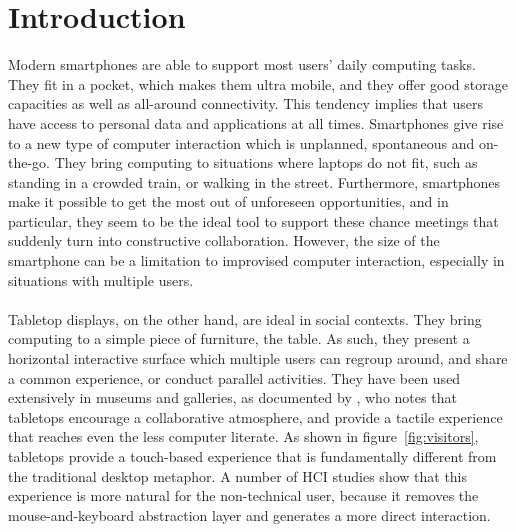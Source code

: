 

%

\chapter{Introduction}
\label{introduction}

Modern smartphones are able to support most users' daily computing tasks.
They fit in a pocket, which makes them ultra mobile, and they offer good storage capacities as well as all-around connectivity.
This tendency implies that users have access to personal data and applications at all times.
Smartphones give rise to a new type of computer interaction which is unplanned, spontaneous and on-the-go.
They bring computing to situations where laptops do not fit, such as standing in a crowded train, or walking in the street.
Furthermore, smartphones make it possible to get the most out of unforeseen opportunities, and in particular, they seem to be the ideal tool to support these chance meetings that suddenly turn into constructive collaboration.
However, the size of the smartphone can be a limitation to improvised computer interaction, especially in situations with multiple users. 
\\\\
Tabletop displays, on the other hand, are ideal in social contexts.
They bring computing to a simple piece of furniture, the table.
As such, they present a horizontal interactive surface which multiple users can regroup around, and share a common experience, or conduct parallel activities.
They have been used extensively in museums and galleries, as documented by \cite{Geller:2006:exhibits}, who notes that tabletops encourage a collaborative atmosphere, and provide a tactile experience that reaches even the less computer literate.
As shown in figure~\ref{fig:visitors}, tabletops provide a touch-based experience that is fundamentally different from the traditional desktop metaphor.
A number of HCI studies show that this experience is more natural for the non-technical user, because it removes the mouse-and-keyboard abstraction layer and generates a more direct interaction.

